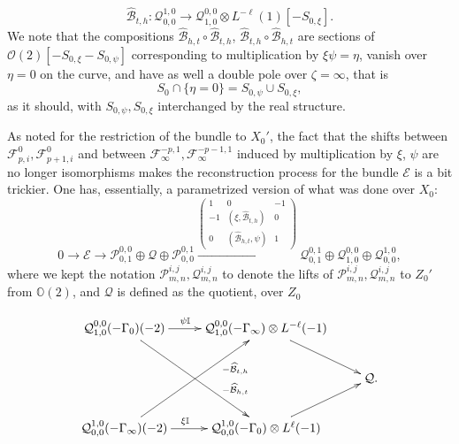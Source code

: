\documentclass[12pt]{article}
\theoremstyle{definition}
\theoremstyle{remark}
\numberwithin{theorem}{section}
\def\bO{{\mathbb {O}}}
\def\bI{{\mathbb {I}}}
\def\pB{{\mathcal B}}
\def\pE{{\mathcal E}}
\def\pF{{\mathcal F}}
\def\pO{{\mathcal O}}
\def\pP{{\mathcal P}}
\def\pQ{{\mathcal Q}}
\begin{document}
\begin{equation} \label{shiftdown} \widehat \pB_{t,h}: \pQ^{1,0}_{0,0}\rightarrow  \pQ^{0 ,0}_{ 1,0}\otimes L^{ -\ell}(1)[-S_{0,\xi}]. \end{equation}We note that the compositions
$\widehat \pB_{h,t}\circ \widehat \pB_{t,h}$, $\widehat \pB_{t,h}\circ \widehat \pB_{h,t}$ are sections of $\pO(2)[-S_{0,\xi}-S_{0,\psi}]$ corresponding to multiplication by $\xi\psi = \eta$, vanish over $\eta= 0$ on the curve, and have as well a double pole over $\zeta=\infty$, that is
$$S_0 \cap \{\eta= 0\} =  S_{0,\psi}\cup S_{0,\xi},$$
 as it should, with $ S_{0,\psi}, S_{0,\xi}$ interchanged by the real structure.
 

As noted for the restriction of the bundle to $X_0'$, the fact that the shifts between $\pF^0_{p ,i}, \pF^0_{p+1,i}$ and between $\pF_\infty^{-p,1}, \pF_\infty^{-p-1,1}$ induced by multiplication by $\xi$, $\psi$ are no longer isomorphisms makes the reconstruction process for the bundle $\pE$ is a bit trickier. One has,   essentially, a parametrized version of what was done over $X_0$:
  \begin{equation} \label{cal-E-sequence}
  0\rightarrow \pE \rightarrow \pP^{0,0}_{0,1}\oplus \pQ \oplus \pP^{0,1}_{0,0} \xrightarrow{\begin{pmatrix}1& 0 &-1\\  
  -1&(\xi,\widehat \pB_{t,h})& 0\\ 0& (\widehat \pB_{h,t},\psi)& 1\end{pmatrix}} \pQ_{0,1}^{0,1}\oplus \pQ_{ 1,0}^{0,0} \oplus \pQ_{0,0}^{1,0},\end{equation}
where we kept the notation  $\pP^{i,j}_{m,n},\pQ^{i,j}_{m,n}$ to denote the lifts of $\pP^{i,j}_{m,n},\pQ^{i,j}_{m,n}$ to $Z_0'$ from $\bO(2)$, and   $\pQ$ is defined as the quotient, over $Z_0$
  
 \begin{equation} \label{define-pQ2}\xymatrix{  
  \pQ_{ 1,0}^{0,0}( -\Gamma_0)(-2)   \ar[ddr]^(0.7){ -\widehat \pB_{h,t}}\ar[r]^(0.43){\psi\bI} &  \pQ_{ 1,0}^{0,0}(-\Gamma_\infty )  \otimes L^{-\ell} (-1) \ar[rd]  \\
 &&\pQ. \\
\pQ_{0 ,0}^{ 1,0} (-\Gamma_\infty) (-2) \ar[uur]_(0.7){-\widehat \pB_{t,h}}\ar[r]^(0.43){\xi\bI} &  \pQ_{0 ,0}^{ 1,0} (-\Gamma_0 )\otimes L^{\ell}(-1)   \ar[ur] \\ }
\end{equation}
 
\end{document}
